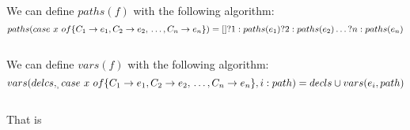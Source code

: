 We can define $paths(f)$ with the following algorithm:
$$paths(case\ x\ of \{C_1 \rightarrow e_1, \\
                      C_2 \rightarrow e_2, \\
                      \ldots, \\
                      C_n \rightarrow e_n\}) \\
                      = [] \\
                      ? 1:paths(e_1) \\
                      ? 2:paths(e_2) \\
                      \ldots \\
                      ? n:paths(e_n) \\
$$\\
We can define $vars(f)$ with the following algorithm:
$$vars(delcs, _, case\ x\ of \{C_1 \rightarrow e_1, \\
                               C_2 \rightarrow e_2, \\
                               \ldots, \\
                               C_n \rightarrow e_n\}, i:path) \\
                               = decls \cup vars(e_i, path)
$$\\

That is 
